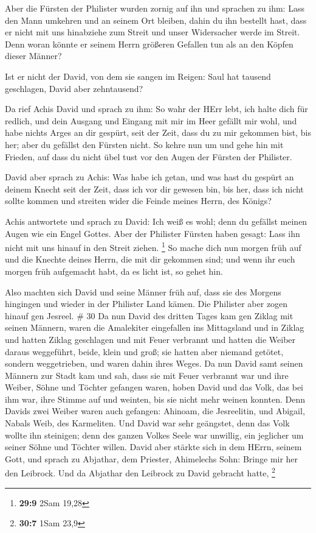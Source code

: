  Aber die Fürsten der Philister wurden zornig auf ihn und
sprachen zu ihm: Lass den Mann umkehren und an seinem Ort bleiben, dahin
du ihn bestellt hast, dass er nicht mit uns hinabziehe zum Streit und
unser Widersacher werde im Streit. Denn woran könnte er seinem Herrn
größeren Gefallen tun als an den Köpfen dieser Männer?

 Ist er nicht der David, von dem sie sangen im Reigen: Saul
hat tausend geschlagen, David aber zehntausend?

 Da rief Achis David und sprach zu ihm: So wahr der HErr
lebt, ich halte dich für redlich, und dein Ausgang und Eingang mit mir
im Heer gefällt mir wohl, und habe nichts Arges an dir gespürt, seit der
Zeit, dass du zu mir gekommen bist, bis her; aber du gefällst den
Fürsten nicht.  So kehre nun um und gehe hin mit Frieden,
auf dass du nicht übel tust vor den Augen der Fürsten der Philister.

 David aber sprach zu Achis: Was habe ich getan, und was
hast du gespürt an deinem Knecht seit der Zeit, dass ich vor dir gewesen
bin, bis her, dass ich nicht sollte kommen und streiten wider die Feinde
meines Herrn, des Königs?

 Achis antwortete und sprach zu David: Ich weiß es wohl;
denn du gefällst meinen Augen wie ein Engel Gottes. Aber der Philister
Fürsten haben gesagt: Lass ihn nicht mit uns hinauf in den Streit
ziehen. \footnote{\textbf{29:9} 2Sam 19,28}  So mache dich
nun morgen früh auf und die Knechte deines Herrn, die mit dir gekommen
sind; und wenn ihr euch morgen früh aufgemacht habt, da es licht ist, so
gehet hin.

 Also machten sich David und seine Männer früh auf, dass
sie des Morgens hingingen und wieder in der Philister Land kämen. Die
Philister aber zogen hinauf gen Jesreel. \# 30  Da nun David
des dritten Tages kam gen Ziklag mit seinen Männern, waren die
Amalekiter eingefallen ins Mittagsland und in Ziklag und hatten Ziklag
geschlagen und mit Feuer verbrannt  und hatten die Weiber
daraus weggeführt, beide, klein und groß; sie hatten aber niemand
getötet, sondern weggetrieben, und waren dahin ihres Weges. 
Da nun David samt seinen Männern zur Stadt kam und sah, dass sie mit
Feuer verbrannt war und ihre Weiber, Söhne und Töchter gefangen waren,
 hoben David und das Volk, das bei ihm war, ihre Stimme auf
und weinten, bis sie nicht mehr weinen konnten.  Denn Davids
zwei Weiber waren auch gefangen: Ahinoam, die Jesreelitin, und Abigail,
Nabals Weib, des Karmeliten.  Und David war sehr geängstet,
denn das Volk wollte ihn steinigen; denn des ganzen Volkes Seele war
unwillig, ein jeglicher um seiner Söhne und Töchter willen. David aber
stärkte sich in dem HErrn, seinem Gott,  und sprach zu
Abjathar, dem Priester, Ahimelechs Sohn: Bringe mir her den Leibrock.
Und da Abjathar den Leibrock zu David gebracht hatte, \footnote{\textbf{30:7}
  1Sam 23,9}

